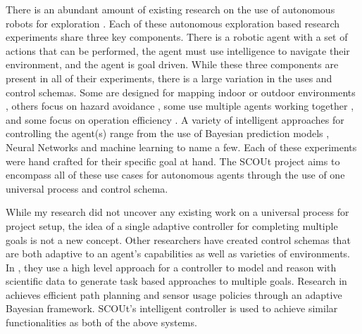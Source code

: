 There is an abundant amount of existing research on the use of autonomous robots for exploration
\cite{christensen_multi-robot_2017, tai_autonomous_2017, stachniss_exploration_2004, clark_mobile_2007, perea_strom_robust_2017, fink_tier-scalable_2007, bai_toward_2017}.
Each of these autonomous exploration based research experiments share three key components.
There is a robotic agent with a set of actions that can be performed, the agent must use intelligence to navigate their environment, and the agent is goal driven.
While these three components are present in all of their experiments, there is a large variation in the uses and control schemas.
Some are designed for mapping indoor or outdoor environments \cite{tai_autonomous_2017,  stachniss_exploration_2004, perea_strom_robust_2017}, others focus on hazard avoidance \cite{christensen_multi-robot_2017, fink_tier-scalable_2007}, some use multiple agents working together \cite{christensen_multi-robot_2017, clark_mobile_2007}, and some focus on operation efficiency \cite{bai_toward_2017}.
A variety of intelligent approaches for controlling the agent(s) range from the use of Bayesian prediction models \cite{christensen_multi-robot_2017}, Neural Networks \cite{tai_autonomous_2017} and machine learning \cite{bai_toward_2017} to name a few.
Each of these experiments were hand crafted for their specific goal at hand.
The SCOUt project aims to encompass all of these use cases for autonomous agents through the use of one universal process and control schema.

While my research did not uncover any existing work on a universal process for project setup, the idea of a single adaptive controller for completing multiple goals is not a new concept.
Other researchers \cite{arora_approach_2017, hutter_online_2018} have created control schemas that are both adaptive to an agent's capabilities as well as varieties of environments.
In \cite{arora_approach_2017}, they use a high level approach for a controller to model and reason with scientific data to generate task based approaches to multiple goals.
Research in \cite{hutter_online_2018} achieves efficient path planning and sensor usage policies through an adaptive Bayesian framework.
SCOUt's intelligent controller is used to achieve similar functionalities as both of the above systems.


